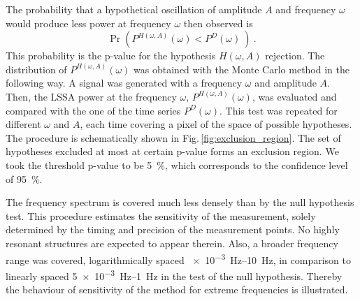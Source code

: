 The probability that a hypothetical oscillation of amplitude $A$ and frequency $\omega$ would produce less power at frequency $\omega$ then observed is
\begin{equation}
  \Pr\left( P^{H(\omega, A)}(\omega) < P^D(\omega)\ \right) \ .
\end{equation}
This probability is the p-value for the hypothesis $H(\omega, A)$ rejection.
The distribution of $P^{H(\omega, A)}(\omega)$ was obtained with the Monte Carlo method in the following way.
A signal was generated with a frequency $\omega$ and amplitude $A$.
Then, the LSSA power at the frequency $\omega$, $P^{H(\omega, A)}(\omega)$, was evaluated and compared with the one of the time series $P^D(\omega)$.
This test was repeated for different $\omega$ and $A$, each time covering a pixel of the space of possible hypotheses.
The procedure is schematically shown in Fig.\,\ref{fig:exclusion_region}.
The set of hypotheses excluded at most at certain p-value forms an exclusion region.
We took the threshold p-value to be \SI{5}{\percent}, which corresponds to the confidence level of \SI{95}{\percent}.

The frequency spectrum is covered much less densely than by the null hypothesis test.
This procedure estimates the sensitivity of the measurement, solely determined by the timing and precision of the measurement points.
No highly resonant structures are expected to appear therein.
Also, a broader frequency range was covered, logarithmically spaced \SIrange[range-phrase=--]{e-3}{10}{\hertz}, in comparison to linearly spaced \SIrange[range-phrase=--]{5e-3}{1}{\hertz} in the test of the null hypothesis.
Thereby the behaviour of sensitivity of the method for extreme frequencies is illustrated.


